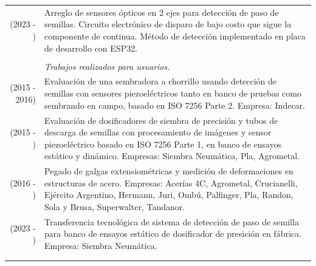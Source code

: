 \documentclass[a4paper,10pt, sans]{article}
\begin{document}
  \begin{table}[H]
  \centering
  \begin{tabularx}{\textwidth}{r X}  
   (2023 - ) & Arreglo de sensores ópticos en 2 ejes para detección de paso de semillas. Circuito electrónico de disparo de bajo costo que sigue la componente de continua. Método de detección implementado en placa de desarrollo con ESP32.\\ \\
        
        
        
        
        {} & \hspace{2cm} \textit{Trabajos realizados para usuarios.} \\ [1ex]
        (2015 - 2016) & Evaluación de una sembradora a chorrillo usando detección de semillas con sensores piezoeléctricos tanto en banco de pruebas como sembrando en campo, basado en ISO 7256 Parte 2. Empresa: Indecar. \\  [1ex]

        (2015 - ) & Evaluación de dosificadores de siembra de precisión y tubos de descarga de semillas con procesamiento de imágenes y sensor piezoeléctrico basado en ISO 7256 Parte 1, en banco de ensayos estático y dinámico. Empresas: Siembra Neumática, Pla, Agrometal. \\ [1ex]
        (2016 - ) & Pegado de galgas extensiométricas y medición de deformaciones en estructuras de acero. Empresas: Acerías 4C, Agrometal, Crucianelli, Ejército Argentino, Hermann, Juri, Ombú, Palfinger, Pla, Randon, Sola y Brusa, Superwalter, Tandanor. \\ [1ex]
        (2023 - ) & Transferencia tecnológica de sistema de detección de paso de semilla para banco de ensayos estático de dosificador de presición en fábrica. Empresa: Siembra Neumática. \\ \\ \hline \\


\end{tabularx}
\end{table}
\end{document}
